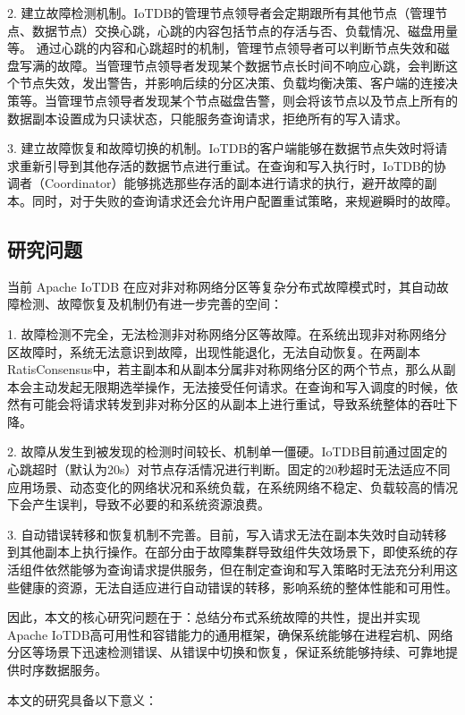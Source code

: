 2. 建立故障检测机制。IoTDB的管理节点领导者会定期跟所有其他节点（管理节点、数据节点）交换心跳，心跳的内容包括节点的存活与否、负载情况、磁盘用量等。
通过心跳的内容和心跳超时的机制，管理节点领导者可以判断节点失效和磁盘写满的故障。当管理节点领导者发现某个数据节点长时间不响应心跳，会判断这个节点失效，发出警告，并影响后续的分区决策、负载均衡决策、客户端的连接决策等。当管理节点领导者发现某个节点磁盘告警，则会将该节点以及节点上所有的数据副本设置成为只读状态，只能服务查询请求，拒绝所有的写入请求。

3. 建立故障恢复和故障切换的机制。IoTDB的客户端能够在数据节点失效时将请求重新引导到其他存活的数据节点进行重试。在查询和写入执行时，IoTDB的协调者（Coordinator）能够挑选那些存活的副本进行请求的执行，避开故障的副本。同时，对于失败的查询请求还会允许用户配置重试策略，来规避瞬时的故障。


\subsection{研究问题}\label{1-motivation}

当前 Apache IoTDB 在应对非对称网络分区等复杂分布式故障模式时，其自动故障检测、故障恢复及\failover 机制仍有进一步完善的空间：

1. 故障检测不完全，无法检测非对称网络分区等故障。在系统出现非对称网络分区故障时，系统无法意识到故障，出现性能退化，无法自动恢复。在两副本RatisConsensus中，若主副本和从副本分属非对称网络分区的两个节点，那么从副本会主动发起无限期选举操作，无法接受任何请求。在查询和写入调度的时候，依然有可能会将请求转发到非对称分区的从副本上进行重试，导致系统整体的吞吐下降。

2. 故障从发生到被发现的检测时间较长、机制单一僵硬。IoTDB目前通过固定的心跳超时（默认为20s）对节点存活情况进行判断。固定的20秒超时无法适应不同应用场景、动态变化的网络状况和系统负载，在系统网络不稳定、负载较高的情况下会产生误判，导致不必要的\failover 和系统资源浪费。

3. 自动错误转移和恢复机制不完善。目前，写入请求无法在副本失效时自动转移到其他副本上执行操作。在部分由于故障集群导致组件失效场景下，即使系统的存活组件依然能够为查询请求提供服务，但在制定查询和写入策略时无法充分利用这些健康的资源，无法自适应进行自动错误的转移，影响系统的整体性能和可用性。

因此，本文的核心研究问题在于：总结分布式系统故障的共性，提出并实现Apache IoTDB高可用性和容错能力的通用框架，确保系统能够在进程宕机、网络分区等场景下迅速检测错误、从错误中切换和恢复，保证系统能够持续、可靠地提供时序数据服务。

本文的研究具备以下意义：

